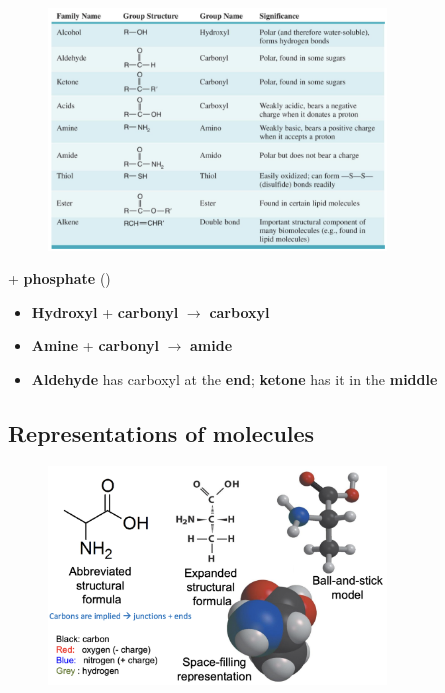 \documentclass[a4paper, 12pt]{article}
\begin{document}
\begin{figure}[H]
\centering
\includegraphics[width=0.8\textwidth]{functionalgroups}
\end{figure}

+ \textbf{phosphate} ()

\begin{itemize}
\item \textbf{Hydroxyl} + \textbf{carbonyl} $\to$ \textbf{carboxyl}
\item \textbf{Amine} + \textbf{carbonyl} $\to$ \textbf{amide}
\item \textbf{Aldehyde} has carboxyl at the \textbf{end}; \textbf{ketone} has it in the \textbf{middle}
\end{itemize}

\subsection*{Representations of molecules}

\begin{figure}[H]
\centering
\includegraphics[width=0.8\textwidth]{models}
\end{figure}
\end{document}
